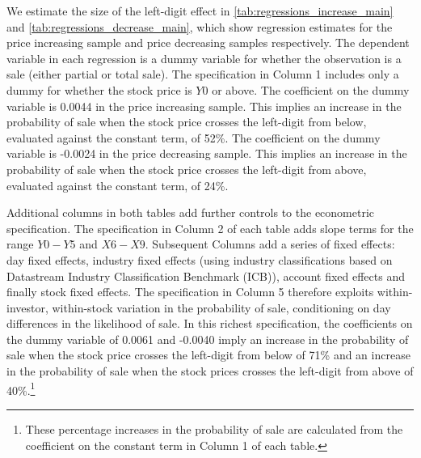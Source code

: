 We estimate the size of the left-digit effect in \ref{tab:regressions_increase_main} and \ref{tab:regressions_decrease_main}, which show regression estimates for the price increasing sample and price decreasing samples respectively. The dependent variable in each regression is a dummy variable for whether the observation is a sale (either partial or total sale). The specification in Column 1 includes only a dummy for whether the stock price is $Y0$ or above. The coefficient on the dummy variable is 0.0044 in the price increasing sample. This implies an increase in the probability of sale when the stock price crosses the left-digit from below, evaluated against the constant term, of 52\%. The coefficient on the dummy variable is -0.0024 in the price decreasing sample. This implies an increase in the probability of sale when the stock price crosses the left-digit from above, evaluated against the constant term, of 24\%. 

Additional columns in both tables add further controls to the econometric specification. The specification in Column 2 of each table adds slope terms for the range $Y0 - Y5$ and $X6 - X9$. Subsequent Columns add a series of fixed effects: day fixed effects, industry fixed effects (using industry classifications based on Datastream Industry Classification Benchmark (ICB)), account fixed effects and finally stock fixed effects. The specification in Column 5 therefore exploits within-investor, within-stock variation in the probability of sale, conditioning on day differences in the likelihood of sale. In this richest specification, the coefficients on the dummy variable of 0.0061 and -0.0040 imply an increase in the probability of sale when the stock price crosses the left-digit from below of 71\% and an increase in the probability of sale when the stock prices crosses the left-digit from above of 40\%.\footnote{These percentage increases in the probability of sale are calculated from the coefficient on the constant term in Column 1 of each table.}

